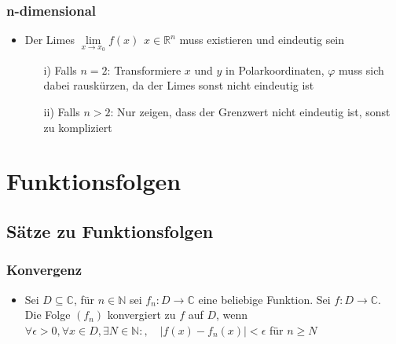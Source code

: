 \documentclass[a3paper, 11pt, landscape]{scrartcl}
\begin{document}
\begin{multicols*}{3}
	\subsubsection{n-dimensional}
	\begin{itemize}
	    \item Der Limes $\lim\limits_{x \rightarrow x_0} f(x) \hspace{5pt} x \in \mathbb{R}^n$ muss existieren und eindeutig sein\\
		\begin{itemize}{Anmerkungen:}
			\item [i)] Falls $n=2$: Transformiere $x$ und $y$ in Polarkoordinaten, $\varphi$ muss sich dabei rauskürzen, da der Limes sonst nicht eindeutig ist
			\item [ii)] Falls $n>2$: Nur zeigen, dass der Grenzwert nicht eindeutig ist, sonst zu kompliziert
		\end{itemize}
	\end{itemize}
	
	\section{Funktionsfolgen}
	\subsection{Sätze zu Funktionsfolgen}
	
	\subsubsection{Konvergenz}
	\begin{itemize}
	    \item Sei $D \subseteq \mathbb{C}$, für $n\in\mathbb{N}$ sei $f_n:D\to\mathbb{C}$ eine beliebige Funktion. Sei $f:D\to\mathbb{C}$. \\
	    Die Folge $(f_n)$ konvergiert zu $f$ auf $D$, wenn \\ $\forall \epsilon >0, \forall x \in D, \exists N \in \mathbb{N}:, \quad | f(x)-f_n(x) | < \epsilon $ für $n \geq N$
	\end{itemize}
	

\end{multicols*}
\end{document}
